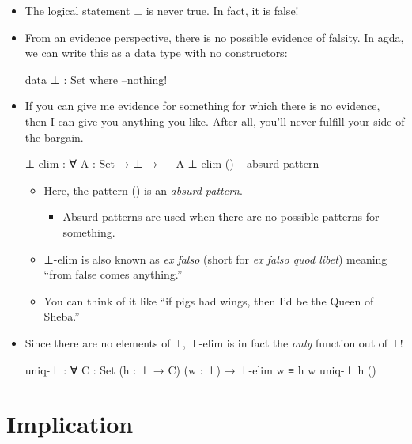 \documentclass{lecturenotes}
\begin{document}
\begin{itemize}
\item The logical statement $\bot$ is never true.
  In fact, it is false!
\item From an evidence perspective, there is no possible evidence of falsity.
  In agda, we can write this as a data type with no constructors:
\begin{code}
data ⊥ : Set where
--nothing!    
\end{code}
\item If you can give me evidence for something for which there is no evidence, then I can give you anything you like.
  After all, you'll never fulfill your side of the bargain.
\begin{code}
⊥-elim : ∀ {A : Set} →
   ⊥ →
  ---
   A
⊥-elim () -- absurd pattern    
\end{code}
\begin{itemize}
\item Here, the pattern \textsf{()} is an \emph{absurd pattern}.
  \begin{itemize}
  \item Absurd patterns are used when there are no possible patterns for something.
  \end{itemize}
\item \textsf{⊥-elim} is also known as \emph{ex falso} (short for \emph{ex falso quod libet}) meaning ``from false comes anything.''
\item You can think of it like ``if pigs had wings, then I'd be the Queen of Sheba.''
\end{itemize}
\item Since there are no elements of $\bot$, \textsf{⊥-elim} is in fact the \emph{only} function out of $\bot$!
\begin{code}
uniq-⊥ : ∀ {C : Set} (h : ⊥ → C) (w : ⊥) → ⊥-elim w ≡ h w
uniq-⊥ h ()    
\end{code}
\end{itemize}

\section{Implication}
\label{sec:implication}
\end{document}
